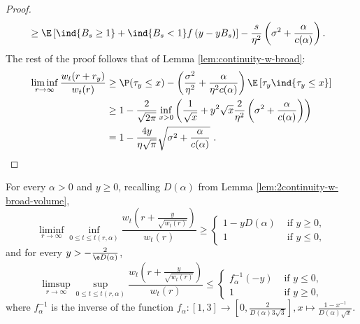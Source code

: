 \documentclass[10pt,a4paper]{article}
\begin{document}
\begin{proof}
\begin{align*}
&\geq \E\left[ \ind{B_s\geq 1} + \ind{B_s<1} f\left(y-yB_s\right)\right] - \frac{s}{\eta^2}\left(\sigma^2 + \frac{\alpha}{c(\alpha)}\right) .%
\end{align*}
The rest of the proof follows that of Lemma \ref{lem:continuity-w-broad}:
\begin{align*}
\liminf_{r\to\infty} \frac{w_t(r+r_y)}{w_t(r)} &\geq \P(\tau_y \leq x) - \left( \frac{\sigma^2}{\eta^2} + \frac{\alpha}{\eta^2 c(\alpha)} \right) \E\left[\tau_y \ind{\tau_y\leq x}\right] \\
&\geq 1 - \frac{2}{\sqrt{2\pi}} \inf_{x>0} \left( \frac{1}{\sqrt{x}} + y^2 \sqrt{x} \frac{2}{\eta^2}\left(\sigma^2 + \frac{\alpha}{c(\alpha)}\right) \right) \\
&= 1 - \frac{4y}{\eta\sqrt{\pi}} \sqrt{\sigma^2 + \frac{\alpha}{c(\alpha)}} \ .
\end{align*}
\end{proof}




\begin{lemma}\label{lem:2continuity-w-broad-volume-strong}
For every $\alpha>0$ and $y\geq 0$, recalling $D(\alpha)$ from Lemma \ref{lem:2continuity-w-broad-volume}, 
\begin{equation}\label{eq:2continuity-ratio-vol-right-strong}
\liminf_{r\to\infty} \inf_{0\leq t \leq t(r,\alpha)} \frac{w_t\left(r + \frac{y}{\sqrt{w_t(r)}}\right)}{w_t(r)} \geq
\begin{cases}
1 - y D(\alpha)  &\text{ if } y\geq 0, \\
1 &\text{ if } y\leq 0 ,
\end{cases}
\end{equation}
and for every $y > - \frac{2}{\e D(\alpha)}$, 
\begin{equation}\label{eq:2continuity-ratio-vol-left-strong}
\limsup_{r\to\infty} \sup_{0\leq t \leq t(r,\alpha)} \frac{w_t\left(r + \frac{y}{\sqrt{w_t(r)}}\right)}{w_t(r)} \leq 
\begin{cases}
f_\alpha^{-1}(-y)  &\text{ if } y\leq 0 , \\
1 &\text{ if } y\geq 0 ,
\end{cases}
\end{equation}
where $f_\alpha^{-1}$ is the inverse of the function $f_\alpha : [1,3] \to [0, \frac{2}{D(\alpha) 3\sqrt{3}} ] , x \mapsto \frac{1-x^{-1}}{D(\alpha)\sqrt{x}} $. 
\end{lemma}
\end{document}
